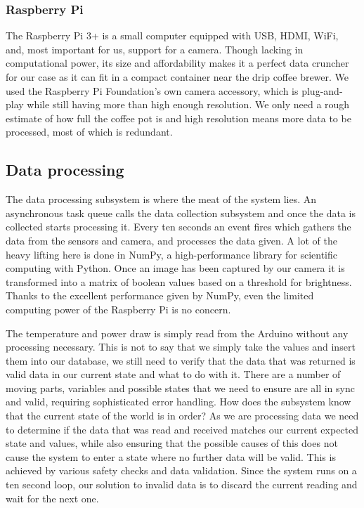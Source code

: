 \documentclass[12pt,a4paper,oneside,article]{memoir}
\numberwithin{equation}{chapter}
\begin{document}
\subsubsection{Raspberry Pi}\label{sec:raspberry-pi}
The Raspberry Pi 3+ is a small computer equipped with USB, HDMI, WiFi, and, most
important for us, support for a camera. Though lacking in computational power,
its size and affordability makes it a perfect data cruncher for our case as it
can fit in a compact container near the drip coffee brewer. We used the
Raspberry Pi Foundation's own camera accessory, which is plug-and-play while
still having more than high enough resolution. We only need a rough estimate of
how full the coffee pot is and high resolution means more data to be processed,
most of which is redundant.

\subsection{Data processing}\label{sec:data-processing}
The data processing subsystem is where the meat of the system lies. An
asynchronous task queue calls the data collection subsystem and once the data is
collected starts processing it. Every ten seconds an event fires which gathers
the data from the sensors and camera, and processes the data given. A lot of the
heavy lifting here is done in NumPy, a high-performance library for scientific
computing with Python. Once an image has been captured by our camera it is
transformed into a matrix of boolean values based on a threshold for brightness.
Thanks to the excellent performance given by NumPy, even the limited computing
power of the Raspberry Pi is no concern.

The temperature and power draw is simply read from the Arduino without any
processing necessary. This is not to say that we simply take the values and
insert them into our database, we still need to verify that the data that was
returned is valid data in our current state and what to do with it. There are a
number of moving parts, variables and possible states that we need to ensure are
all in sync and valid, requiring sophisticated error handling. How does the
subsystem know that the current state of the world is in order? As we are
processing data we need to determine if the data that was read and received
matches our current expected state and values, while also ensuring that the
possible causes of this does not cause the system to enter a state where no
further data will be valid. This is achieved by various safety checks and data
validation. Since the system runs on a ten second loop, our solution to invalid
data is to discard the current reading and wait for the next one.
\end{document}
